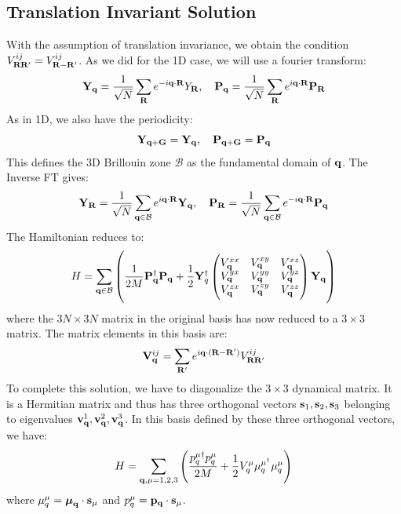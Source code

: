 \subsection{Translation Invariant Solution}
With the assumption of translation invariance, we obtain the condition $V^{ij}_{\mathbf{R}\mathbf{R}'} = V^{ij}_{\mathbf{R} - \mathbf{R}'}$. As we did for the 1D case, we will use a fourier transform:
\begin{equation}
    \mathbf{Y}_{\mathbf{q}} = \frac{1}{\sqrt{N}}\sum_{\mathbf{R}}e^{-i\mathbf{q} \cdot \mathbf{R}}Y_{\mathbf{R}}, \quad \mathbf{P}_{\mathbf{q}} = \frac{1}{\sqrt{N}}\sum_{\mathbf{R}}e^{i\mathbf{q} \cdot \mathbf{R}}\mathbf{P}_{\mathbf{R}}
\end{equation}
As in 1D, we also have the periodicity:
\begin{equation}
    \mathbf{Y}_{\mathbf{q} + \mathbf{G}} = \mathbf{Y}_{\mathbf{q}}, \quad \mathbf{P}_{\mathbf{q} + \mathbf{G}} = \mathbf{P}_{\mathbf{q}}
\end{equation}
This defines the 3D Brillouin zone $\mathcal{B}$ as the fundamental domain of $\mathbf{q}$. The Inverse FT gives:
\begin{equation}
    \mathbf{Y}_{\mathbf{R}} = \frac{1}{\sqrt{N}}\sum_{\mathbf{q} \in \mathcal{B}}e^{i\mathbf{q} \cdot \mathbf{R}}\mathbf{Y}_{\mathbf{q}}, \quad \mathbf{P}_{\mathbf{R}} = \frac{1}{\sqrt{N}}\sum_{\mathbf{q} \in \mathcal{B}}e^{-i\mathbf{q} \cdot \mathbf{R}}\mathbf{P}_{\mathbf{q}}
\end{equation}
The Hamiltonian reduces to:
\begin{equation}
    H = \sum_{\mathbf{q} \in \mathcal{B}} \left(\frac{1}{2M}\mathbf{P}^\dagger_{\mathbf{q}} \mathbf{P}_{\mathbf{q}} + \frac{1}{2}\mathbf{Y}_q^\dagger \begin{pmatrix}V_{\mathbf{q}}^{xx} & V_{\mathbf{q}}^{xy} & V_{\mathbf{q}}^{xz} \\ V_{\mathbf{q}}^{yx} & V_{\mathbf{q}}^{yy} & V_{\mathbf{q}}^{yz} \\ V_{\mathbf{q}}^{zx} & V_{\mathbf{q}}^{zy} & V_{\mathbf{q}}^{zz}\end{pmatrix}\mathbf{Y}_{\mathbf{q}}\right)
\end{equation}
where the $3N \times 3N$ matrix in the original basis has now reduced to a $3 \times 3$ matrix. The matrix elements in this basis are:
\begin{align*}
    \mathbf{V}_{\mathbf{q}}^{ij} = \sum_{\mathbf{R}'}e^{i\mathbf{q} \cdot (\mathbf{R} - \mathbf{R}')}V_{\mathbf{R}\mathbf{R}'}^{ij}
\end{align*}
To complete this solution, we have to diagonalize the $3 \times 3$ dynamical matrix. It is a Hermitian matrix and thus has three orthogonal vectors $\mathbf{s}_1, \mathbf{s}_2, \mathbf{s}_3$ belonging to eigenvalues $\mathbf{v}^1_{\mathbf{q}}, \mathbf{v}^2_{\mathbf{q}}, \mathbf{v}^3_{\mathbf{q}}$. In this basis defined by these three orthogonal vectors, we have:
\begin{equation}
    H = \sum_{\mathbf{q}, \mu=1,2,3}\left(\frac{p_q^{\mu\dagger}p_q^\mu}{2M} + \frac{1}{2}V_q^\mu \mu_q^{\mu^\dagger}\mu^\mu_q\right)
\end{equation}
where $\mu_q^\mu = \mbox{\boldmath$ \mu $}_{\mathbf{q}} \cdot \mathbf{s}_\mu$ and $p_q^\mu = \mathbf{p}_{\mathbf{q}} \cdot \mathbf{s}_\mu$. 


